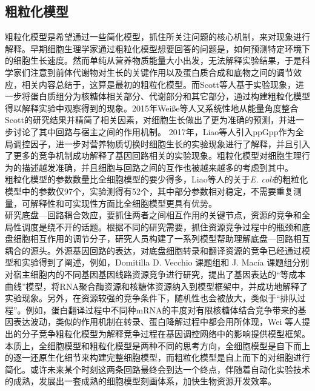 \documentclass[b5paper,9pt,oneolumn,twoside,UTF8]{article}
\begin{document}
\subsection{粗粒化模型}
粗粒化模型是希望通过一些简化模型，抓住所关注问题的核心机制，来对现象进行解释。早期细胞生理学家通过粗粒化模型想要回答的问题是，如何预测特定环境下的细胞生长速度。然而单纯从营养物质能量大小出发，无法解释实验结果，于是科学家们注意到前体代谢物对生长的关键作用以及蛋白质合成和底物之间的调节效应，相关内容总结于\cite{marr1991growth}，这算是最初的粗粒化模型。而Scott等人基于实验现象，进一步将蛋白质组分为核糖体相关部分、代谢部分和其它部分，通过构建粗粒化模型得以解释实验中观察得到的现象\cite{Scott2010}。2015年Weiße等人又系统性地从能量角度整合Scott的研究结果并精简了相关因素，对细胞生长做出了更为准确的预测，并进一步讨论了其中回路与宿主之间的作用机制\cite{Weiße2015}。
2017年，Liao等人引入ppGpp作为全局调控因子，进一步对营养物质切换时细胞生长的实验现象进行了解释，并且引入了更多的竞争机制成功解释了基因回路相关的实验现象\cite{Liao2017}。粗粒化模型对细胞生理行为的描述越发准确，并且细胞与回路之间的互作也被越来越多的考虑到其中。\\
\indent 粗粒化模型的参数数量比全细胞模型的要少得多，Liao等人的关于\emph{E. coli}的粗粒化模型中的参数仅97个，实验测得有52个，其中部分参数相对稳定，不需要重复测量，可解释性和可实现性方面比全细胞模型更具有优势\cite{Liao2017}。\\
\indent 研究底盘---回路耦合效应，要抓住两者之间相互作用的关键节点，资源的竞争和全局性调度是绕不开的话题。根据不同的研究需要，抓住资源竞争过程中的瓶颈和底盘细胞相互作用的调节分子，研究人员构建了一系列模型帮助理解底盘---回路相互耦合的源头。外源基因回路的表达，对底盘细胞转录和翻译资源的竞争已经通过模型和实验得到了阐述，例如，Domitilla D. Vecchio 课题组和 J. Macía 课题组分别对宿主细胞内的不同基因基因线路资源竞争进行研究，提出了基因表达的“等成本曲线”模型，将RNA聚合酶资源和核糖体资源纳入到模型框架中，并成功地解释了实验现象\cite{10.1093/nar/gkv1280, 10.1016/j.bpj.2015.06.034}。另外，在资源较强的竞争条件下，随机性也会被放大，类似于“排队过程”。例如，蛋白翻译过程中不同种mRNA的丰度对有限核糖体结合竞争带来的基因表达波动\cite{Mather2013}，类似的作用机制在转录、蛋白降解\cite{Cookson2011a}过程中都会用所体现，Wei 等人提出的分子竞争粗粒化模型为解释竞争过程在基因调控网络中的影响提供模型框架\cite{Wei2019}。\\
\indent 本质上，全细胞模型和粗粒化模型是两种不同的思考方向，全细胞模型是自下而上的逐一还原生化细节来构建完整细胞模型，而粗粒化模型是自上而下的对细胞进行简化。或许未来某个时刻这两条回路最终会到达一个终点，伴随着自动化实验技术的成熟，发展出一套成熟的细胞模型刻画体系，加快生物资源开发效率\cite{2018he}。
\end{document}
